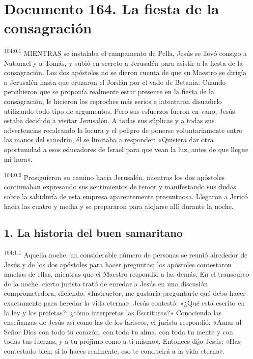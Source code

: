 \chapter{Documento 164. La fiesta de la consagración}
\par 
\textsuperscript{164:0.1} MIENTRAS se instalaba el campamento de Pella, Jesús se llevó consigo a Natanael y a Tomás, y subió en secreto a Jerusalén para asistir a la fiesta de la consagración. Los dos apóstoles no se dieron cuenta de que su Maestro se dirigía a Jerusalén hasta que cruzaron el Jordán por el vado de Betania. Cuando percibieron que se proponía realmente estar presente en la fiesta de la consagración, le hicieron los reproches más serios e intentaron disuadirlo utilizando todo tipo de argumentos. Pero sus esfuerzos fueron en vano; Jesús estaba decidido a visitar Jerusalén. A todas sus súplicas y a todas sus advertencias recalcando la locura y el peligro de ponerse voluntariamente entre las manos del sanedrín, él se limitaba a responder: «Quisiera dar otra oportunidad a esos educadores de Israel para que vean la luz, antes de que llegue mi hora».

\par 
\textsuperscript{164:0.2} Prosiguieron su camino hacia Jerusalén, mientras los dos apóstoles continuaban expresando sus sentimientos de temor y manifestando sus dudas sobre la sabiduría de esta empresa aparentemente presuntuosa. Llegaron a Jericó hacia las cuatro y media y se prepararon para alojarse allí durante la noche.

\section*{1. La historia del buen samaritano}
\par 
\textsuperscript{164:1.1} Aquella noche, un considerable número de personas se reunió alrededor de Jesús y de los dos apóstoles para hacer preguntas; los apóstoles contestaron muchas de ellas, mientras que el Maestro respondió a las demás. En el transcurso de la noche, cierto jurista trató de enredar a Jesús en una discusión comprometedora, diciendo: «Instructor, me gustaría preguntarte qué debo hacer exactamente para heredar la vida eterna». Jesús contestó: «¿Qué está escrito en la ley y los profetas?; ¿cómo interpretas las Escrituras?» Conociendo las enseñanzas de Jesús así como las de los fariseos, el jurista respondió: «Amar al Señor Dios con todo tu corazón, con toda tu alma, con toda tu mente y con todas tus fuerzas, y a tu prójimo como a ti mismo». Entonces dijo Jesús: «Has contestado bien; si lo haces realmente, eso te conducirá a la vida eterna».

